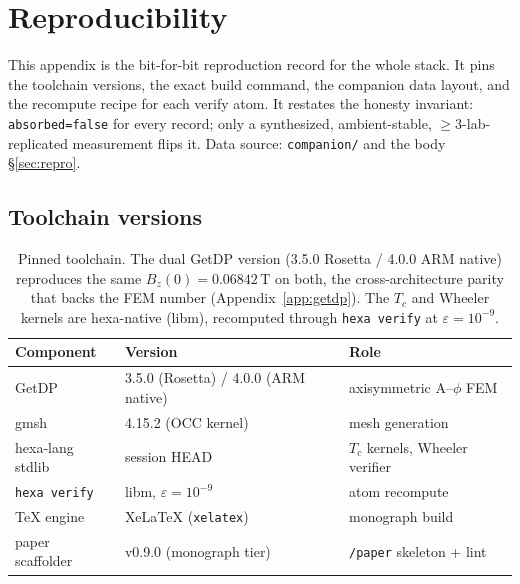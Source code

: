 \section{Reproducibility}
\label{app:repro}

This appendix is the bit-for-bit reproduction record for the whole stack.
It pins the toolchain versions, the exact build command, the companion
data layout, and the recompute recipe for each verify atom. It restates
the honesty invariant: \texttt{absorbed=false} for every record; only a
synthesized, ambient-stable, $\ge\!3$-lab-replicated measurement flips it.
Data source: \texttt{companion/} and the body \S\ref{sec:repro}.

\subsection{Toolchain versions}
\label{app:repro-toolchain}

\begin{table}[h]
\centering
\small
\setlength{\tabcolsep}{8pt}
\begin{tabular}{@{}lll@{}}
\toprule
\textbf{Component} & \textbf{Version} & \textbf{Role} \\
\midrule
GetDP   & 3.5.0 (Rosetta) / 4.0.0 (ARM native) & axisymmetric A--$\phi$ FEM \\
gmsh    & 4.15.2 (OCC kernel) & mesh generation \\
hexa-lang stdlib & session HEAD & $T_c$ kernels, Wheeler verifier \\
\texttt{hexa verify} & libm, $\varepsilon{=}10^{-9}$ & atom recompute \\
\TeX{} engine & XeLaTeX (\texttt{xelatex}) & monograph build \\
paper scaffolder & v0.9.0 (monograph tier) & \texttt{/paper} skeleton + lint \\
\bottomrule
\end{tabular}
\caption{Pinned toolchain. The dual GetDP version (3.5.0 Rosetta /
4.0.0 ARM native) reproduces the same $B_z(0)=0.06842$\,T on both, the
cross-architecture parity that backs the FEM number
(Appendix~\ref{app:getdp}). The $T_c$ and Wheeler kernels are hexa-native
(libm), recomputed through \texttt{hexa verify} at $\varepsilon=10^{-9}$.}
\label{tab:toolchain}
\end{table}

